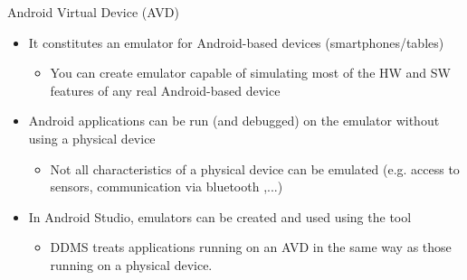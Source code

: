 \documentclass{beamer}
\begin{document}
  \begin{frame}{Android Virtual Device (AVD)}
    \begin{itemize}\itemsep10pt
      \item It constitutes an emulator for Android-based devices (smartphones/tables)
      \begin{itemize}
        \item You can create emulator capable of simulating most of the HW and SW
        features of any real Android-based device 
      \end{itemize}
      \item Android applications can be run (and debugged) on the emulator
      without using a physical device
      \begin{itemize}
        \item Not all characteristics of a physical device can be emulated (e.g.
        access to sensors, communication via bluetooth ,...)
      \end{itemize}
      \item In Android Studio, emulators can be created and used using the
       tool
      \begin{itemize}
        \item DDMS treats applications running on an AVD in the same way as
        those running on a physical device.
      \end{itemize}
    \end{itemize}
  \end{frame}
\end{document}
